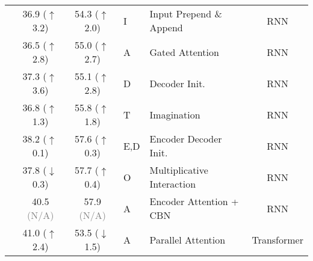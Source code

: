 \documentclass{svjour3}
\newcommand{\uua}[0]{$\uparrow\,$}
\newcommand{\dda}[0]{$\mathbf{\downarrow}\,$}
\newcommand{\sspn}[1]{\textcolor{ssp}{(\uua #1)}}
\newcommand{\ssmn}[1]{\textcolor{ssm}{(\dda #1)}}
\newcommand{\na}[0]{\textcolor{gray}{(N/A)}}
\begin{document}
\begin{table}[t]
{\begin{tabular}{@{}lccllc@{}}
\citet{calixto-incorporating-2017}        & 36.9 \sspn{3.2}   & 54.3 \sspn{2.0}   & I   & Input Prepend \& Append & RNN     \\
  
\citet{calixto-doubly-2017}               & 36.5 \sspn{2.8}   & 55.0 \sspn{2.7}   & A   & Gated Attention    &  RNN    \\

\citet{calixto-incorporating-2017}        & 37.3 \sspn{3.6}   & 55.1 \sspn{2.8}   & D   & Decoder Init.       &  RNN   \\

\citet{elliott-imagination-2017}          & 36.8 \sspn{1.3}   & 55.8 \sspn{1.8}   & T   & Imagination        & RNN     \\
  
\citet{caglayan-lium-cvc-2017}            & 38.2 \sspn{0.1}   & 57.6 \sspn{0.3}   & E,D  & Encoder Decoder Init.  & RNN    \\
                                            & 37.8 \ssmn{0.3}   & 57.7 \sspn{0.4}   & O    & Multiplicative Interaction & RNN \\
  
\citet{delbrouck-modulating-2017}         & 40.5 \na          & 57.9 \na          & A    & Encoder Attention + CBN & RNN  \\
  \midrule


\citet{arslan-doubly-2018}                & 41.0 \sspn{2.4}   & 53.5 \ssmn{1.5}  & A    & Parallel Attention  & Transformer   \\


\end{tabular}}
\end{table}
\end{document}
